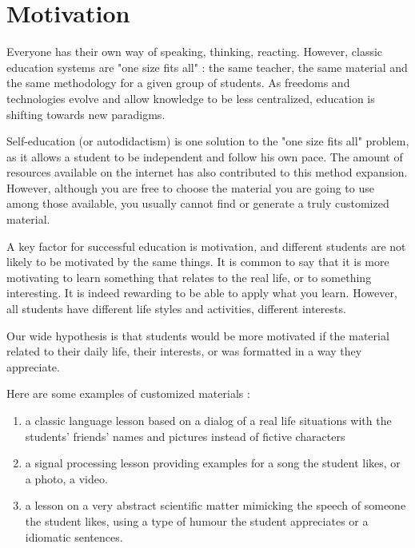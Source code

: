 \documentclass[a4paper,12pt]{article}
\begin{document}
\maketitle
\tableofcontents
\newpage


\section{Motivation}

Everyone has their own way of speaking, thinking, reacting. However, classic education systems are "one size fits all" : the same teacher, the same material and the same methodology for a given group of students. As freedoms and technologies evolve and allow knowledge to be less centralized, education is shifting towards new paradigms.

Self-education (or autodidactism) is one solution to the "one size fits all" problem, as it allows a student to be independent and follow his own pace. The amount of resources available on the internet has also contributed to this method expansion. However, although you are free to choose the material you are going to use among those available, you usually cannot find or generate a truly customized material.

A key factor for successful education is motivation, and different students are not likely to be motivated by the same things. It is common to say that it is more motivating to learn something that relates to the real life, or to something interesting. It is indeed rewarding to be able to apply what you learn. However, all students have different life styles and activities, different interests.

Our wide hypothesis is that students would be more motivated if the material related to their daily life, their interests, or was formatted in a way they appreciate.

Here are some examples of customized materials :

\begin{enumerate}
\item a classic language lesson based on a dialog of a real life situations with the students' friends' names and pictures instead of fictive characters
\item a signal processing lesson providing examples for a song the student likes, or a photo, a video.
\item a lesson on a very abstract scientific matter mimicking the speech of someone the student likes, using a type of humour the student appreciates or a idiomatic sentences.
\end{enumerate}
\end{document}
